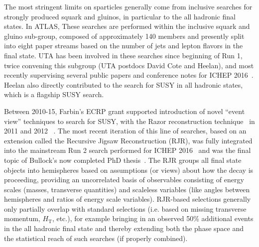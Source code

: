 
The most stringent limits on sparticles generally come from inclusive
searches for strongly produced squark and gluinos, in particular to
the all hadronic final states. In ATLAS, These searches are performed
within the inclusive squark and gluino sub-group, composed of
approximately 140 members and presently split into eight paper streams
based on the number of jets and lepton flavors in the final state.
UTA has been involved in these searches since beginning of Run 1,
twice convening this subgroup (UTA postdocs David Cote and Heelan),
and most recently supervising several public papers and conference
notes for ICHEP
2016~\cite{Aad:2016jxj,Aaboud:2016zdn,Aad:2016qqk,ATLAS-CONF-2015-082,Aad:2016tuk,Aad:2016eki,Aaboud:2016zpr,ATLASCollaboration:2016wlb,ATLAS-CONF-2016-078,ATLAS-CONF-2016-054,ATLAS-CONF-2016-037,ATLAS-CONF-2016-052,ATLAS-CONF-2016-066,ATLAS-CONF-2016-095}. Heelan
also directly contributed to the search for SUSY in all hadronic
states, which is a flagship SUSY search.

Between 2010-15, Farbin's ECRP grant supported introduction of novel
``event view'' techniques to search for SUSY, with the Razor
reconstruction technique~\cite{Rogan:2010kb} in 2011\cite{Aad:2012naa}
and 2012 ~\cite{Aad:2015iea}. The most recent iteration of this line
of searches, based on an extension called the Recursive Jigsaw
Reconstruction (RJR), was fully integrated into the mainstream Run 2
search performed for ICHEP 2016~\cite{ATLAS-CONF-2016-078} and was the
final topic of Bullock's now completed PhD thesis~\cite{}. The RJR
groups all final state objects into hemispheres based on assumptions
(or views) about how the decay is proceeding, providing an
uncorrelated basis of observables consisting of energy scales (masses,
transverse quantities) and scaleless variables (like angles between
hemispheres and ratios of energy scale variables). RJR-based
selections generally only partially overlap with standard selections
(i.e. based on missing transverse momentum, $H_\mathrm{T}$, etc.), for
example bringing in an observed 50\% additional events in the all
hadronic final state and thereby extending both the phase space
and the statistical reach of such searches (if properly combined).


